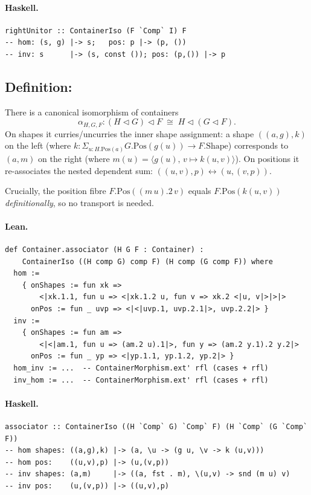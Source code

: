 \documentclass[11pt,a4paper]{article}
\begin{document}
\paragraph{Haskell.}
\begin{lstlisting}[style=haskell]
rightUnitor :: ContainerIso (F `Comp` I) F
-- hom: (s, g) |-> s;   pos: p |-> (p, ())
-- inv: s      |-> (s, const ()); pos: (p,()) |-> p
\end{lstlisting}


\subsection{Definition: }

\begin{defn}[Associator]
There is a canonical isomorphism of containers
\[
  \alpha_{H,G,F} : (H \triangleleft G) \triangleleft F \;\cong\;
  H \triangleleft (G \triangleleft F).
\]
On shapes it curries/uncurries the inner shape assignment:
a shape $((a, g), k)$ on the left (where $k : \Sigma_{u : H.\mathrm{Pos}(a)}
G.\mathrm{Pos}(g(u)) \to F.\mathrm{Shape}$) corresponds to $(a, m)$ on the
right (where $m(u) = \langle g(u),\, v \mapsto k(u, v) \rangle$).
On positions it re-associates the nested dependent sum:
$(( u, v ), p) \leftrightarrow (u, (v, p))$.

Crucially, the position fibre $F.\mathrm{Pos}((m\,u).2\,v)$ equals
$F.\mathrm{Pos}(k(u, v))$ \emph{definitionally}, so no transport is needed.
\end{defn}

\paragraph{Lean.}
\begin{lstlisting}[style=lean]
def Container.associator (H G F : Container) :
    ContainerIso ((H comp G) comp F) (H comp (G comp F)) where
  hom :=
    { onShapes := fun xk =>
        <|xk.1.1, fun u => <|xk.1.2 u, fun v => xk.2 <|u, v|>|>|>
      onPos := fun _ uvp => <|<|uvp.1, uvp.2.1|>, uvp.2.2|> }
  inv :=
    { onShapes := fun am =>
        <|<|am.1, fun u => (am.2 u).1|>, fun y => (am.2 y.1).2 y.2|>
      onPos := fun _ yp => <|yp.1.1, yp.1.2, yp.2|> }
  hom_inv := ...  -- ContainerMorphism.ext' rfl (cases + rfl)
  inv_hom := ...  -- ContainerMorphism.ext' rfl (cases + rfl)
\end{lstlisting}

\paragraph{Haskell.}
\begin{lstlisting}[style=haskell]
associator :: ContainerIso ((H `Comp` G) `Comp` F) (H `Comp` (G `Comp` F))
-- hom shapes: ((a,g),k) |-> (a, \u -> (g u, \v -> k (u,v)))
-- hom pos:    ((u,v),p) |-> (u,(v,p))
-- inv shapes: (a,m)     |-> ((a, fst . m), \(u,v) -> snd (m u) v)
-- inv pos:    (u,(v,p)) |-> ((u,v),p)
\end{lstlisting}
\end{document}
